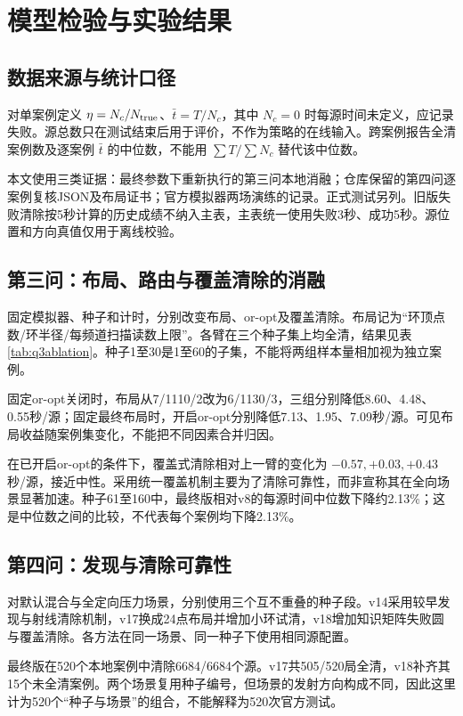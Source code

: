 \section{模型检验与实验结果}
\subsection{数据来源与统计口径}
对单案例定义 $\eta=N_c/N_{\rm true}$、$\bar t=T/N_c$，其中 $N_c=0$ 时每源时间未定义，应记录失败。源总数只在测试结束后用于评价，不作为策略的在线输入。跨案例报告全清案例数及逐案例 $\bar t$ 的中位数，不能用 $\sum T/\sum N_c$ 替代该中位数。

本文使用三类证据：最终参数下重新执行的第三问本地消融；仓库保留的第四问逐案例复核JSON及布局证书；官方模拟器两场演练的记录。正式测试另列。旧版失败清除按5秒计算的历史成绩不纳入主表，主表统一使用失败3秒、成功5秒。源位置和方向真值仅用于离线校验。

\subsection{第三问：布局、路由与覆盖清除的消融}
固定模拟器、种子和计时，分别改变布局、or-opt及覆盖清除。布局记为“环顶点数/环半径/每频道扫描读数上限”。各臂在三个种子集上均全清，结果见表\ref{tab:q3ablation}。种子1至30是1至60的子集，不能将两组样本量相加视为独立案例。
\begin{table}[htbp]\centering\small
\caption{第三问最终配置消融：每源时间中位数（秒/源）}\label{tab:q3ablation}

\end{table}
固定or-opt关闭时，布局从7/1110/2改为6/1130/3，三组分别降低8.60、4.48、0.55秒/源；固定最终布局时，开启or-opt分别降低7.13、1.95、7.09秒/源。可见布局收益随案例集变化，不能把不同因素合并归因。

在已开启or-opt的条件下，覆盖式清除相对上一臂的变化为 $-0.57,+0.03,+0.43$ 秒/源，接近中性。采用统一覆盖机制主要为了清除可靠性，而非宣称其在全向场景显著加速。种子61至160中，最终版相对v8的每源时间中位数下降约2.13\%；这是中位数之间的比较，不代表每个案例均下降2.13\%。

\subsection{第四问：发现与清除可靠性}
对默认混合与全定向压力场景，分别使用三个互不重叠的种子段。v14采用较早发现与射线清除机制，v17换成24点布局并增加小环试清，v18增加知识矩阵失败圆与覆盖清除。各方法在同一场景、同一种子下使用相同源配置。
\begin{table}[htbp]\centering\small
\caption{第四问全清案例数与最终版每源时间中位数}\label{tab:q4audit}

\end{table}
最终版在520个本地案例中清除6684/6684个源。v17共505/520局全清，v18补齐其15个未全清案例。两个场景复用种子编号，但场景的发射方向构成不同，因此这里计为520个“种子与场景”的组合，不能解释为520次官方测试。

